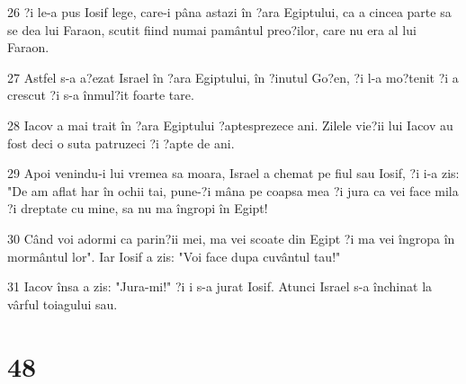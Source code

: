 \par 26 ?i le-a pus Iosif lege, care-i pâna astazi în ?ara Egiptului, ca a cincea parte sa se dea lui Faraon, scutit fiind numai pamântul preo?ilor, care nu era al lui Faraon.
\par 27 Astfel s-a a?ezat Israel în ?ara Egiptului, în ?inutul Go?en, ?i l-a mo?tenit ?i a crescut ?i s-a înmul?it foarte tare.
\par 28 Iacov a mai trait în ?ara Egiptului ?aptesprezece ani. Zilele vie?ii lui Iacov au fost deci o suta patruzeci ?i ?apte de ani.
\par 29 Apoi venindu-i lui vremea sa moara, Israel a chemat pe fiul sau Iosif, ?i i-a zis: "De am aflat har în ochii tai, pune-?i mâna pe coapsa mea ?i jura ca vei face mila ?i dreptate cu mine, sa nu ma îngropi în Egipt!
\par 30 Când voi adormi ca parin?ii mei, ma vei scoate din Egipt ?i ma vei îngropa în mormântul lor". Iar Iosif a zis: "Voi face dupa cuvântul tau!"
\par 31 Iacov însa a zis: "Jura-mi!" ?i i s-a jurat Iosif. Atunci Israel s-a închinat la vârful toiagului sau.

\chapter{48}

